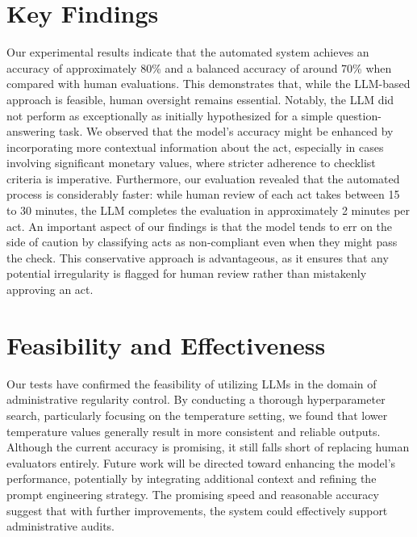 \documentclass[../main.tex]{subfiles}
\begin{document}
\section{Key Findings}
Our experimental results indicate that the automated system achieves an accuracy of approximately 80\% and a balanced accuracy of around 70\% when compared with human evaluations. This demonstrates that, while the LLM-based approach is feasible, human oversight remains essential. Notably, the LLM did not perform as exceptionally as initially hypothesized for a simple question-answering task. We observed that the model's accuracy might be enhanced by incorporating more contextual information about the act, especially in cases involving significant monetary values, where stricter adherence to checklist criteria is imperative. Furthermore, our evaluation revealed that the automated process is considerably faster: while human review of each act takes between 15 to 30 minutes, the LLM completes the evaluation in approximately 2 minutes per act. An important aspect of our findings is that the model tends to err on the side of caution by classifying acts as non-compliant even when they might pass the check. This conservative approach is advantageous, as it ensures that any potential irregularity is flagged for human review rather than mistakenly approving an act.

\section{Feasibility and Effectiveness}
Our tests have confirmed the feasibility of utilizing LLMs in the domain of administrative regularity control. By conducting a thorough hyperparameter search, particularly focusing on the temperature setting, we found that lower temperature values generally result in more consistent and reliable outputs. Although the current accuracy is promising, it still falls short of replacing human evaluators entirely. Future work will be directed toward enhancing the model's performance, potentially by integrating additional context and refining the prompt engineering strategy. The promising speed and reasonable accuracy suggest that with further improvements, the system could effectively support administrative audits.
\end{document}
